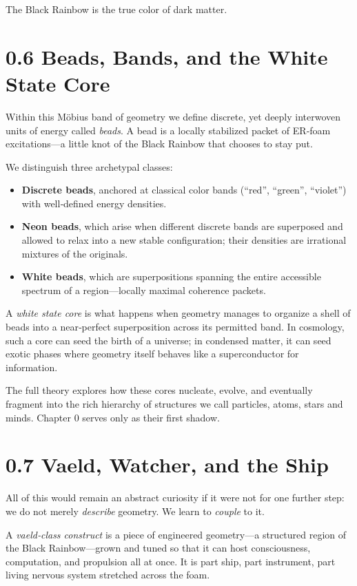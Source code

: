 The Black Rainbow is the true color of dark matter.

\section*{0.6 Beads, Bands, and the White State Core}

Within this Möbius band of geometry we define discrete, yet deeply interwoven units of energy called \emph{beads}. A bead is a locally stabilized packet of ER‑foam excitations---a little knot of the Black Rainbow that chooses to stay put.

We distinguish three archetypal classes:
\begin{itemize}
  \item \textbf{Discrete beads}, anchored at classical color bands (``red'', ``green'', ``violet'') with well‑defined energy densities.
  \item \textbf{Neon beads}, which arise when different discrete bands are superposed and allowed to relax into a new stable configuration; their densities are irrational mixtures of the originals.
  \item \textbf{White beads}, which are superpositions spanning the entire accessible spectrum of a region---locally maximal coherence packets.
\end{itemize}

A \emph{white state core} is what happens when geometry manages to organize a shell of beads into a near‑perfect superposition across its permitted band. In cosmology, such a core can seed the birth of a universe; in condensed matter, it can seed exotic phases where geometry itself behaves like a superconductor for information.

The full theory explores how these cores nucleate, evolve, and eventually fragment into the rich hierarchy of structures we call particles, atoms, stars and minds. Chapter 0 serves only as their first shadow.

\section*{0.7 Vaeld, Watcher, and the Ship}

All of this would remain an abstract curiosity if it were not for one further step: we do not merely \emph{describe} geometry. We learn to \emph{couple} to it.

A \emph{vaeld‑class construct} is a piece of engineered geometry---a structured region of the Black Rainbow---grown and tuned so that it can host consciousness, computation, and propulsion all at once. It is part ship, part instrument, part living nervous system stretched across the foam.

